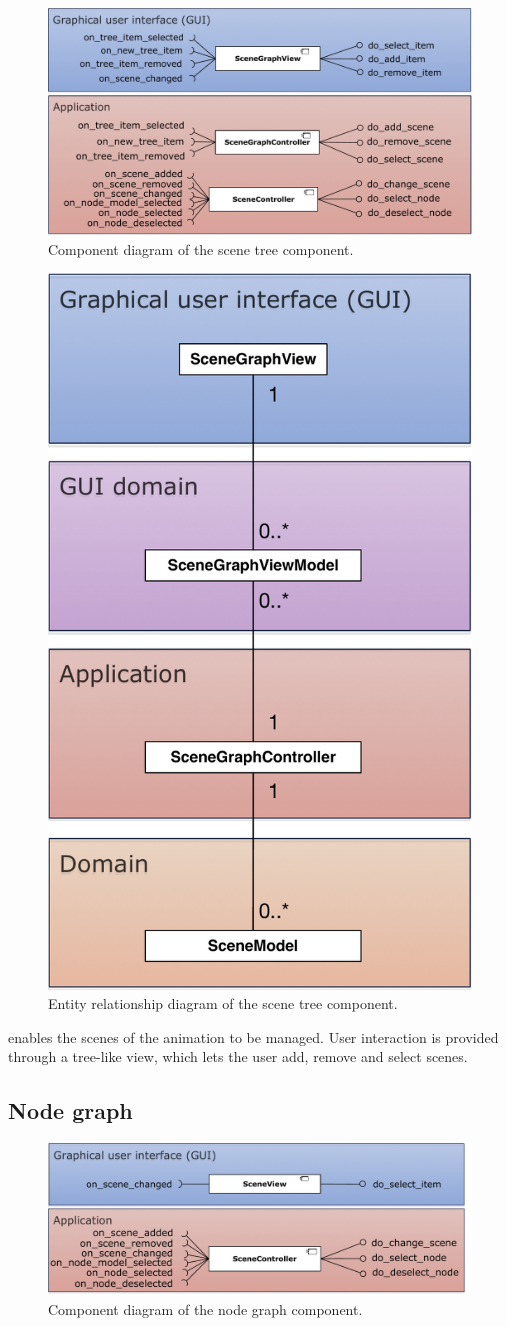\documentclass[%
    a4paper,    %
    justified,  %
    nobib,      %
    openany     %
]{tufte-book}
\makeatletter
\renewcommand{\label}[1]{\@tufte@label{##1}}%
\makeatother
\begin{document}
\begin{figure}[!htbp]
  \caption{Component diagram of the scene tree component.}
\label{fig:scene-graph-component-diagram}
  \includegraphics[width=0.5\linewidth]{images/scene-graph-component-diagram}
\end{figure}

\begin{figure}[!htbp]
  \caption{Entity relationship diagram of the scene tree component.}
\label{fig:scene-graph-erd}
  \includegraphics[width=0.5\linewidth]{images/scene-graph-erd}
\end{figure}

 enables the scenes of the animation to be
managed. User interaction is provided through a tree-like view, which lets the
user add, remove and select scenes.

\subsection{Node graph}
\label{results:subsec:program:node-graph}

\begin{figure}[!htbp]
  \caption{Component diagram of the node graph component.}
\label{fig:node-graph-component-diagram}
  \includegraphics[width=0.5\linewidth]{images/node-graph-component-diagram}
\end{figure}
\end{document}
